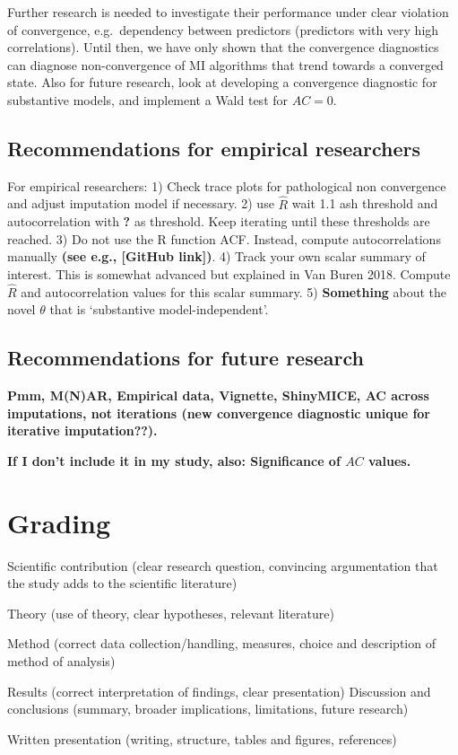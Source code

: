 \documentclass[Royal,times,sageh]{sagej}
\begin{document}
Further research is needed to investigate their performance under clear
violation of convergence, e.g.~dependency between predictors (predictors
with very high correlations). Until then, we have only shown that the
convergence diagnostics can diagnose non-convergence of MI algorithms
that trend towards a converged state. Also for future research, look at
developing a convergence diagnostic for substantive models, and
implement a Wald test for \(AC = 0\).

\hypertarget{recommendations-for-empirical-researchers}{%
\subsection{Recommendations for empirical
researchers}\label{recommendations-for-empirical-researchers}}

For empirical researchers: 1) Check trace plots for pathological non
convergence and adjust imputation model if necessary. 2) use
\(\widehat{R}\) wait 1.1 ash threshold and autocorrelation with
\textbf{?} as threshold. Keep iterating until these thresholds are
reached. 3) Do not use the R function ACF. Instead, compute
autocorrelations manually \textbf{(see e.g., {[}GitHub link{]})}. 4)
Track your own scalar summary of interest. This is somewhat advanced but
explained in Van Buren 2018. Compute \(\widehat{R}\) and autocorrelation
values for this scalar summary. 5) \textbf{Something} about the novel
\(\theta\) that is `substantive model-independent'.

\hypertarget{recommendations-for-future-research}{%
\subsection{Recommendations for future
research}\label{recommendations-for-future-research}}

\textbf{Pmm, M(N)AR, Empirical data, Vignette, ShinyMICE, AC across
imputations, not iterations (new convergence diagnostic unique for
iterative imputation??).}

\textbf{If I don't include it in my study, also: Significance of \(AC\)
values.}

\hypertarget{grading}{%
\section{Grading}\label{grading}}

Scientific contribution (clear research question, convincing
argumentation that the study adds to the scientific literature)

Theory (use of theory, clear hypotheses, relevant literature)

Method (correct data collection/handling, measures, choice and
description of method of analysis)

Results (correct interpretation of findings, clear presentation)
Discussion and conclusions (summary, broader implications, limitations,
future research)

Written presentation (writing, structure, tables and figures,
references)



\end{document}
